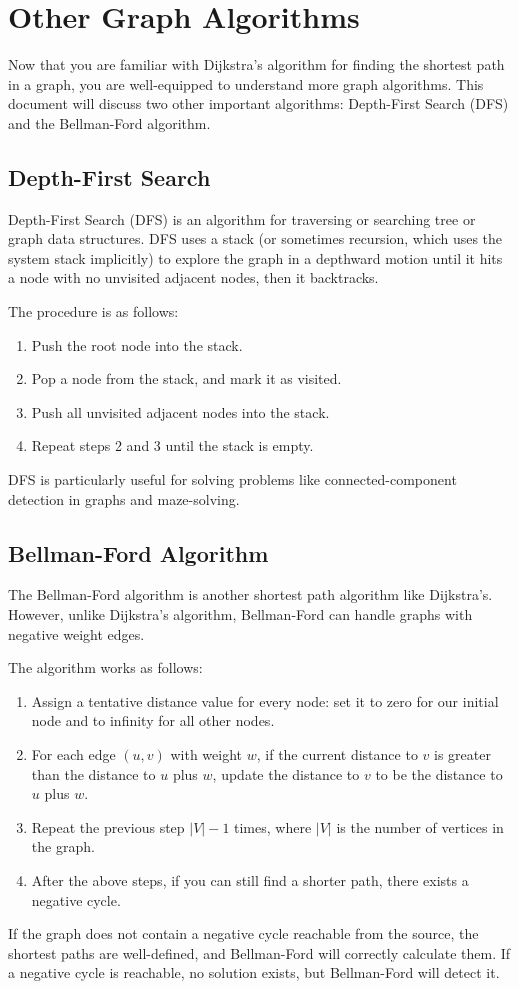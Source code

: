 \chapter{Other Graph Algorithms}

Now that you are familiar with Dijkstra's algorithm for finding the
shortest path in a graph, you are well-equipped to understand more
graph algorithms. This document will discuss two other important
algorithms: Depth-First Search (DFS) and the Bellman-Ford algorithm. 

\section{Depth-First Search}

Depth-First Search (DFS) is an algorithm for traversing or searching
tree or graph data structures. DFS uses a stack (or sometimes
recursion, which uses the system stack implicitly) to explore the graph
in a depthward motion until it hits a node with no unvisited adjacent
nodes, then it backtracks.

The procedure is as follows:

\begin{enumerate}
    \item Push the root node into the stack.
    \item Pop a node from the stack, and mark it as visited.
    \item Push all unvisited adjacent nodes into the stack.
    \item Repeat steps 2 and 3 until the stack is empty.
\end{enumerate}

DFS is particularly useful for solving problems like
connected-component detection in graphs and maze-solving.

\section{Bellman-Ford Algorithm}

The Bellman-Ford algorithm is another shortest path algorithm like
Dijkstra's. However, unlike Dijkstra's algorithm, Bellman-Ford can
handle graphs with negative weight edges.

The algorithm works as follows:

\begin{enumerate}
    \item Assign a tentative distance value for every node: set it to
      zero for our initial node and to infinity for all other nodes.
    \item For each edge $(u, v)$ with weight $w$, if the current
      distance to $v$ is greater than the distance to $u$ plus $w$,
      update the distance to $v$ to be the distance to $u$ plus $w$.
    \item Repeat the previous step $|V| - 1$ times, where $|V|$ is the
      number of vertices in the graph.
    \item After the above steps, if you can still find a shorter path,
      there exists a negative cycle.
\end{enumerate}

If the graph does not contain a negative cycle reachable from the
source, the shortest paths are well-defined, and Bellman-Ford will
correctly calculate them. If a negative cycle is reachable, no
solution exists, but Bellman-Ford will detect it.
